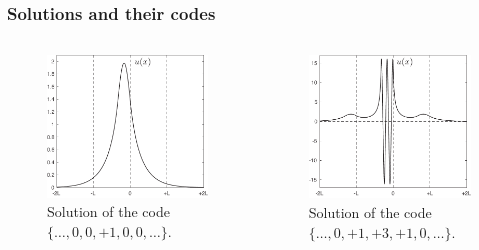 \documentclass [10pt] {beamer}
\begin{document}
\begin{frame}
	\frametitle{Solutions and their codes}
	\begin{columns}[T]
		\begin{column}{.5\textwidth}
			\begin{figure}
			\includegraphics[width = 1\textwidth]{pic/solution-1.pdf}
			\caption{Solution of the code $\{\dots, 0, 0, +1,  0, 0, \dots\}$.}
			\end{figure}
		\end{column}
		\begin{column}{.5\textwidth}
			\begin{figure}
			\includegraphics[width = 1\textwidth]{pic/solution-2.pdf}
			\caption{Solution of the code $\{\dots, 0, +1, +3, +1, 0, \dots\}$.}
			\end{figure}
		\end{column}
	\end{columns}
\end{frame}
\end{document}
